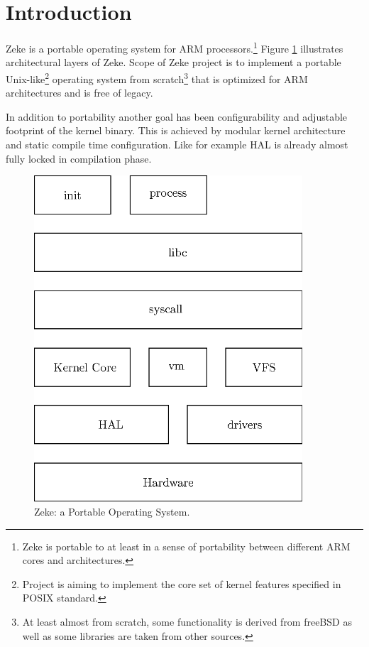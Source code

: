 \part{Introduction}

Zeke is a portable operating system for ARM processors.\footnote{Zeke is
portable to at least in a sense of portability between different ARM cores
and architectures.} Figure \ref{figure:zeke} illustrates architectural layers
of Zeke. Scope of Zeke project is to implement a portable
Unix-like\footnote{Project is aiming to implement the core set of kernel
features specified in \ac{POSIX} standard.} operating system from
scratch\footnote{At least almost from scratch, some functionality is derived
from freeBSD as well as some libraries are taken from other sources.} that
is optimized for ARM architectures and is free of legacy.

In addition to portability another goal has been configurability and adjustable
footprint of the kernel binary. This is achieved by modular kernel architecture
and static compile time configuration. Like for example \ac{HAL} is already
almost fully locked in compilation phase.

\begin{figure}
  \includegraphics[width=10cm]{pics/zeke}
  \centering
  \caption{Zeke: a Portable Operating System.}
  \label{figure:zeke}
\end{figure}


